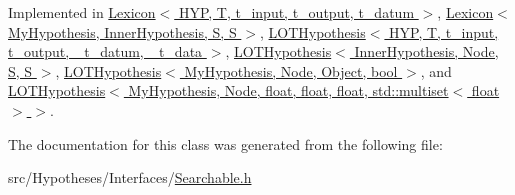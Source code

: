 Implemented in \hyperlink{class_lexicon_a1bad37e75741d1f9f9cf3fb11e9410d1}{Lexicon$<$ H\+Y\+P, T, t\+\_\+input, t\+\_\+output, t\+\_\+datum $>$}, \hyperlink{class_lexicon_a1bad37e75741d1f9f9cf3fb11e9410d1}{Lexicon$<$ My\+Hypothesis, Inner\+Hypothesis, S, S $>$}, \hyperlink{class_l_o_t_hypothesis_a9716b492f5d05d6f008264bca4a4445f}{L\+O\+T\+Hypothesis$<$ H\+Y\+P, T, t\+\_\+input, t\+\_\+output, \+\_\+t\+\_\+datum, \+\_\+t\+\_\+data $>$}, \hyperlink{class_l_o_t_hypothesis_a9716b492f5d05d6f008264bca4a4445f}{L\+O\+T\+Hypothesis$<$ Inner\+Hypothesis, Node, S, S $>$}, \hyperlink{class_l_o_t_hypothesis_a9716b492f5d05d6f008264bca4a4445f}{L\+O\+T\+Hypothesis$<$ My\+Hypothesis, Node, Object, bool $>$}, and \hyperlink{class_l_o_t_hypothesis_a9716b492f5d05d6f008264bca4a4445f}{L\+O\+T\+Hypothesis$<$ My\+Hypothesis, Node, float, float, float, std\+::multiset$<$ float $>$ $>$}.



The documentation for this class was generated from the following file\+:\begin{DoxyCompactItemize}
\item 
src/\+Hypotheses/\+Interfaces/\hyperlink{_searchable_8h}{Searchable.\+h}\end{DoxyCompactItemize}
